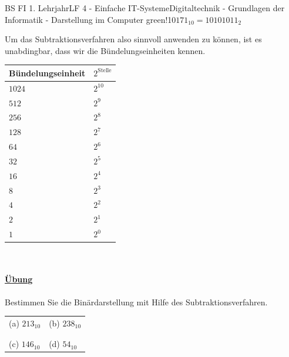 \documentclass[11pt,twocolumn,oneside,openany,headings=optiontotoc,11pt,numbers=noenddot]{article}
\begin{document}
\begin{worksheet}{BS FI 1. Lehrjahr}{LF 4 - Einfache IT-Systeme}{Digitaltechnik - Grundlagen der Informatik - Darstellung im Computer}
{		green!10}{\(171_{10} = 10101011_{2}\)}\\
		\par\noindent
		Um das Subtraktionsverfahren also sinnvoll anwenden zu können, ist es unabdingbar, dass wir die Bündelungseinheiten kennen.\\
		\par\noindent
		\begin{tabularx}{0.45\textwidth}{M|M}
			\textbf{Bündelungseinheit} & \textbf{\(2^{\text{Stelle}}\)}\\
			\hline
			\(1024\) & \(2^{10}\)\\
			\hline
			\(512\) & \(2^{9}\)\\
			\hline
			\(256\) & \(2^{8}\)\\
			\hline
			\(128\) & \(2^{7}\)\\
			\hline
			\(64\) & \(2^{6}\)\\
			\hline
			\(32\) & \(2^{5}\)\\
			\hline
			\(16\) & \(2^{4}\)\\
			\hline
			\(8\) & \(2^{3}\)\\
			\hline
			\(4\) & \(2^{2}\)\\
			\hline
			\(2\) & \(2^{1}\)\\
			\hline
			\(1\) & \(2^{0}\)
		\end{tabularx}\\
		\par\noindent
		\paragraph{\underline{Übung}} Bestimmen Sie die Binärdarstellung mit Hilfe des Subtraktionsverfahren.\\
		\begin{tabularx}{0.45\textwidth}{M|M}
			(a) \(213_{10}\) & (b) \(238_{10}\)\\
			& \\
			\hline
			& \\
			(c) \(146_{10}\) & (d) \(54_{10}\)\\
		\end{tabularx}

\end{worksheet}
\end{document}
